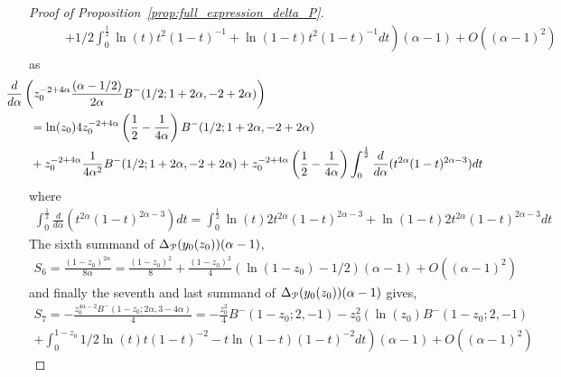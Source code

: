 \begin{proof}[Proof of Proposition~\ref{prop:full_expression_delta_P}]
\begin{align*}
 	&\hspace{20pt}\left.+1/2\int_0^{\frac{1}{2}} \ln(t)t^2(1-t)^{-1}+\ln(1-t)t^2(1-t)^{-1}dt \right)  (\alpha-1)+O( (\alpha-1)^2 )
\end{align*}
as
\begin{align*}
	&\hspace{-20pt}\frac{d}{d \alpha}\left( z_0^{-2 + 4 \alpha} \frac{(\alpha - 1/2 )}{2\alpha} 
		B^-(1/2; 1 + 2 \alpha, -2 + 2 \alpha)\right) \\
	&= \ln(z_0) 4 z_0^{-2+4\alpha} \left(\frac{1}{2}-\frac{1}{4\alpha}\right)B^-(1/2;1+2\alpha,-2+2\alpha)\\
	&+z_0^{-2+4\alpha}\frac{1}{4\alpha^2}B^-(1/2;1+2\alpha,-2+2\alpha)+z_0^{-2+4\alpha}\left(\frac{1}{2}-\frac{1}{4\alpha}\right)\int_0^{\frac{1}{2}} \frac{d}{d\alpha}(t^{2\alpha}(1-t)^{2\alpha-3})dt
\end{align*}
where
\begin{align*}
\int_0^{\frac{1}{2}} \frac{d}{d\alpha}(t^{2\alpha}(1-t)^{2\alpha-3})dt = \int_0^{\frac{1}{2}} \ln(t)2t^{2\alpha}(1-t)^{2\alpha-3}+\ln(1-t)2t^{2\alpha}(1-t)^{2\alpha-3}dt
\end{align*}
The sixth summand of $\Delta_{{\mathcal P}}(y_0(z_0))(\alpha-1)$,
\begin{align*}
	S_6 = \frac{(1 - z_0)^{2 \alpha}}{8 \alpha} = \frac{(1-z_0)^2}{8}+\frac{(1-z_0)^2}{4} (\ln(1-z_0)-1/2 )(\alpha-1)+O( (\alpha-1)^2 )
\end{align*}
and finally the seventh and last summand of $\Delta_{{\mathcal P}}(y_0(z_0))(\alpha-1)$ gives,
\begin{align*}
	S_7 = - \frac{z_0^{4 \alpha - 2} B^-(1 - z_0; 2 \alpha, 3 - 4 \alpha)}{4} = -\frac{z_0^2}{4}B^-(1-z_0;2,-1) - z_0^2 \left(\ln(z_0)B^-(1-z_0;2,-1) \right. \\
\left.+\int_0^{1-z_0} 1/2\ln(t)t(1-t)^{-2}-t\ln(1-t)(1-t)^{-2}dt \right) (\alpha-1)+O((\alpha-1)^2)
\end{align*}


\end{proof}
